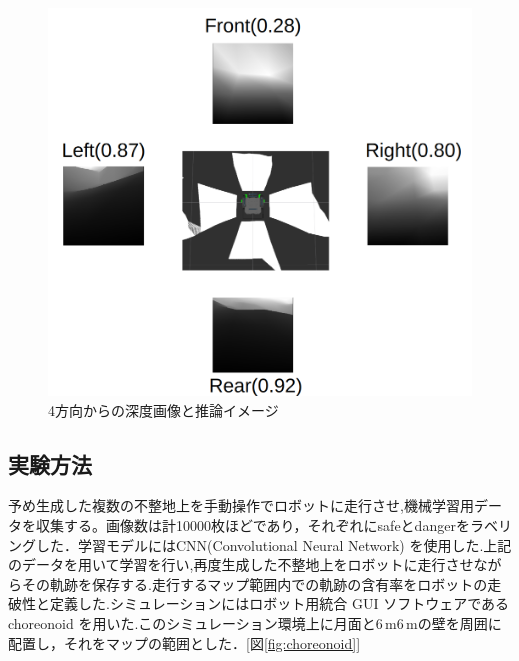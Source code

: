 \documentclass[uplatex,twocolumn, dvipdfmx]{jsarticle}  %
\begin{document}
\begin{figure}[t]
  \begin{center}
    \includegraphics[width=0.6\linewidth]{images/planning.png}
    \caption{4方向からの深度画像と推論イメージ}
    \label{fig:planning}
  \end{center}
\end{figure}

\subsection{実験方法}
予め生成した複数の不整地上を手動操作でロボットに走行させ,機械学習用データを収集する。画像数は計10000枚ほどであり，それぞれにsafeとdangerをラベリングした．学習モデルにはCNN(Convolutional Neural Network) を使用した.上記のデータを用いて学習を行い,再度生成した不整地上をロボットに走行させながらその軌跡を保存する.走行するマップ範囲内での軌跡の含有率をロボットの走破性と定義した.\cite{bunken2}シミュレーションにはロボット用統合 GUI ソフトウェアであるchoreonoid を用いた.このシミュレーション環境上に月面と$6 \mathrm{\,m}$\times$6\mathrm{\,m}$の壁を周囲に配置し，それをマップの範囲とした．[図\ref{fig:choreonoid}]

\end{document}
